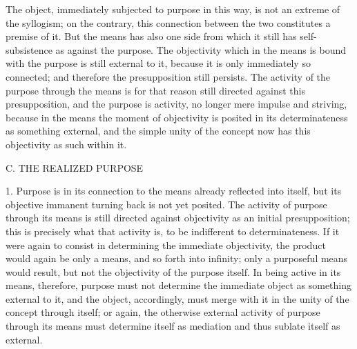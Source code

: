 The object, immediately subjected to purpose in this way, is not an
extreme of the syllogism; on the contrary, this connection between the two
constitutes a premise of it. But the means has also one side from which
it still has self-subsistence as against the purpose. The objectivity which
in the means is bound with the purpose is still external to it, because
it is only immediately so connected; and therefore the presupposition still
persists. The activity of the purpose through the means is for that reason
still directed against this presupposition, and the purpose is activity, no
longer mere impulse and striving, because in the means the moment of
objectivity is posited in its determinateness as something external, and the
simple unity of the concept now has this objectivity as such within it.

C. THE REALIZED PURPOSE

1. Purpose is in its connection to the means already reflected into itself,
but its objective immanent turning back is not yet posited. The activity of
purpose through its means is still directed against objectivity as an initial
presupposition; this is precisely what that activity is, to be indifferent to
determinateness. If it were again to consist in determining the immediate
objectivity, the product would again be only a means, and so forth into
infinity; only a purposeful means would result, but not the objectivity of
the purpose itself. In being active in its means, therefore, purpose must not
determine the immediate object as something external to it, and the object,
accordingly, must merge with it in the unity of the concept through itself;
or again, the otherwise external activity of purpose through its means must
determine itself as mediation and thus sublate itself as external.

